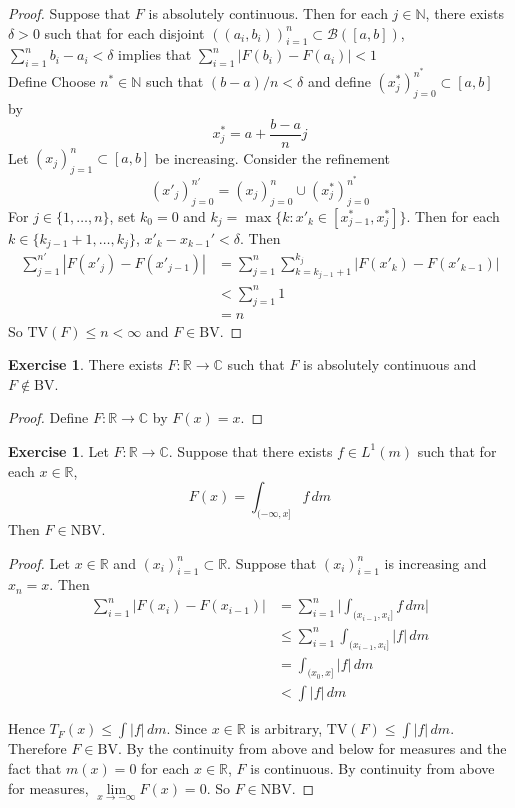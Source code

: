 \documentclass{book}
\theoremstyle{definition}
\newtheorem{ex}[definition]{Exercise}
\newcommand{\del}{\delta}
\newcommand{\C}{\mathbb{C}}
\newcommand{\N}{\mathbb{N}}
\newcommand{\R}{\mathbb{R}}
\newcommand{\MB}{\mathcal{B}}
\newcommand{\lex}[1]{\label{ex:#1}}
\DeclareMathOperator*{\0}{\mbf{0}}
\DeclareMathOperator*{\1}{\mbf{1}}
\newcommand{\dm}{\, d m}
\newcommand{\BV}{\text{BV}}
\newcommand{\NBV}{\text{NBV}}
\newcommand{\TV}{\text{TV}}
\begin{document}
	\begin{proof}
	Suppose that $F$ is absolutely continuous. Then for each $j \in \N$, there exists $\del >0$ such that for each disjoint $((a_i, b_i))_{i=1}^n \subset \MB([a,b])$, $\sum\limits_{i=1}^n b_i-a_i < \del$ implies that $\sum\limits_{i=1}^n|F(b_i)-F(a_i)| < 1$ \\
	Define Choose $n^* \in \N$ such that $(b-a)/n < \del$ and define $(x^*_j)_{j=0}^{n^*} \subset [a,b]$ by 
	$$x^*_j = a + \frac{b-a}{n}j$$ 
	Let $(x_j)_{j=1}^n \subset [a,b]$ be increasing. Consider the refinement 
	$$(x'_j)_{j=0}^{n'} = (x_j)_{j=0}^n \cup (x^*_j)_{j=0}^{n^*}$$ 
	For $j \in \{1, \ldots, n\}$, set $k_0 = 0$ and $k_j = \max \{k: x'_k \in [x^*_{j-1}, x^*_j] \}$. Then for each $k \in \{k_{j-1} + 1, \ldots, k_j\}$, $x'_k - x_{k-1}' < \del$. Then 
	\begin{align*}
	\sum_{j=1}^{n'} |F(x'_j) - F(x'_{j-1})| 
	&= \sum_{j=1}^n \sum_{k=k_{j-1}+1}^{k_j} |F(x'_k) - F(x'_{k-1})|  \\
	&< \sum_{j=1}^n 1  \\
	&= n
	\end{align*}
	So $\TV(F) \leq n < \infty$ and $F \in \BV$. 
	\end{proof}
	
	\begin{ex}
	There exists $F:\R \rightarrow \C$ such that $F$ is absolutely continuous and $F \not \in \BV$. 
	\end{ex}	
	
	\begin{proof}
	Define $F: \R \rightarrow \C$ by $F(x) = x$. 
	\end{proof}
	
	\begin{ex} \lex{00000} 
		Let $F: \R \rightarrow \C$. Suppose that there exists $f \in L^1(m)$ such that for each $x \in \R$,
		$$F(x) = \int_{(-\infty, x]}f\dm$$ 
		Then $F \in \NBV$.
	\end{ex}
	
	\begin{proof}
		Let $x \in \R$ and $(x_i)_{i=1}^n \subset \R$. Suppose that $(x_i)_{i=1}^n$ is increasing and $x_n=x$. Then 
		\begin{align*}
			\sum_{i=1}^n|F(x_i)-F(x_{i-1})| 
			&= \sum_{i=1}^n \bigg| \int_{(x_{i-1},x_i]}f\dm \bigg|\\
			& \leq \sum_{i=1}^n \int_{(x_{i-1},x_i]}|f|\dm \\
			& = \int_{(x_0,x]}|f|\dm\\
			& < \int|f|\dm
		\end{align*}
		
		Hence $T_F(x) \leq \int |f|\dm$. Since $x \in \R$ is arbitrary, $\TV(F) \leq \int |f|\dm$. Therefore $F \in \BV$. By the continuity from above and below for measures and the fact that $m({x})=0$ for each $x \in \R$, $F$ is continuous. By continuity from above for measures, $\lim\limits_{x \rightarrow -\infty} F(x) =0$. So $F \in \NBV$.
	\end{proof}
	
\end{document}
